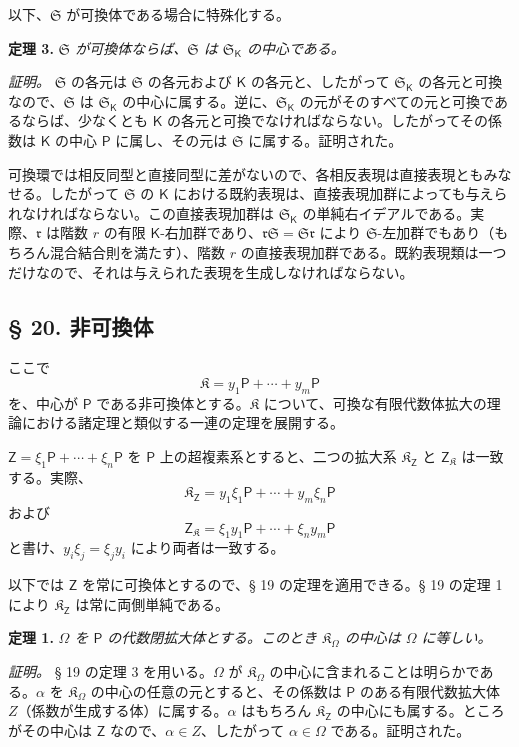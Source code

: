 以下、$\mathfrak S$ が可換体である場合に特殊化する。

\textbf{定理 3.} \emph{$\mathfrak S$ が可換体ならば、$\mathfrak S$ は $\mathfrak S_{\mathsf K}$ の中心である。}

\emph{証明。} $\mathfrak S$ の各元は $\mathfrak S$ の各元および $\mathsf K$ の各元と、したがって $\mathfrak S_{\mathsf K}$ の各元と可換なので、$\mathfrak S$ は $\mathfrak S_{\mathsf K}$ の中心に属する。逆に、$\mathfrak S_{\mathsf K}$ の元がそのすべての元と可換であるならば、少なくとも $\mathsf K$ の各元と可換でなければならない。したがってその係数は $\mathsf K$ の中心 $\mathsf P$ に属し、その元は $\mathfrak S$ に属する。証明された。

可換環では相反同型と直接同型に差がないので、各相反表現は直接表現ともみなせる。したがって $\mathfrak S$ の $\mathsf K$ における既約表現は、直接表現加群によっても与えられなければならない。この直接表現加群は $\mathfrak S_{\mathsf K}$ の単純右イデアルである。実際、$\mathfrak r$ は階数 $r$ の有限 $\mathsf K$-右加群であり、$\mathfrak r\mathfrak S=\mathfrak S\mathfrak r$ により $\mathfrak S$-左加群でもあり（もちろん混合結合則を満たす）、階数 $r$ の直接表現加群である。既約表現類は一つだけなので、それは与えられた表現を生成しなければならない。

\subsection*{§ 20. 非可換体}\label{nichtkommutative-koerper}

ここで
\[
\mathfrak K=y_1\mathsf P+\cdots+y_m\mathsf P
\]
を、中心が $\mathsf P$ である非可換体とする。$\mathfrak K$ について、可換な有限代数体拡大の理論における諸定理と類似する一連の定理を展開する。

$\mathsf{Z}=\xi_1\mathsf P+\cdots+\xi_n\mathsf P$ を $\mathsf P$ 上の超複素系とすると、二つの拡大系 $\mathfrak K_{\mathsf{Z}}$ と $\mathsf{Z}_{\mathfrak K}$ は一致する。実際、
\[
\mathfrak K_{\mathsf{Z}}=y_1\xi_1\mathsf P+\cdots+y_m\xi_n\mathsf P
\]
および
\[
\mathsf{Z}_{\mathfrak K}=\xi_1y_1\mathsf P+\cdots+\xi_ny_m\mathsf P
\]
と書け、$y_i\xi_j=\xi_jy_i$ により両者は一致する。

以下では $\mathsf{Z}$ を常に可換体とするので、§ 19 の定理を適用できる。§ 19 の定理 1 により $\mathfrak K_{\mathsf{Z}}$ は常に両側単純である。

\textbf{定理 1.} \emph{$\Omega$ を $\mathsf P$ の代数閉拡大体とする。このとき $\mathfrak K_\Omega$ の中心は $\Omega$ に等しい。}

\emph{証明。} § 19 の定理 3 を用いる。$\Omega$ が $\mathfrak K_\Omega$ の中心に含まれることは明らかである。$\alpha$ を $\mathfrak K_\Omega$ の中心の任意の元とすると、その係数は $\mathsf P$ のある有限代数拡大体 $Z$（係数が生成する体）に属する。$\alpha$ はもちろん $\mathfrak K_{\mathsf{Z}}$ の中心にも属する。ところがその中心は $\mathsf{Z}$ なので、$\alpha\in Z$、したがって $\alpha\in\Omega$ である。証明された。

